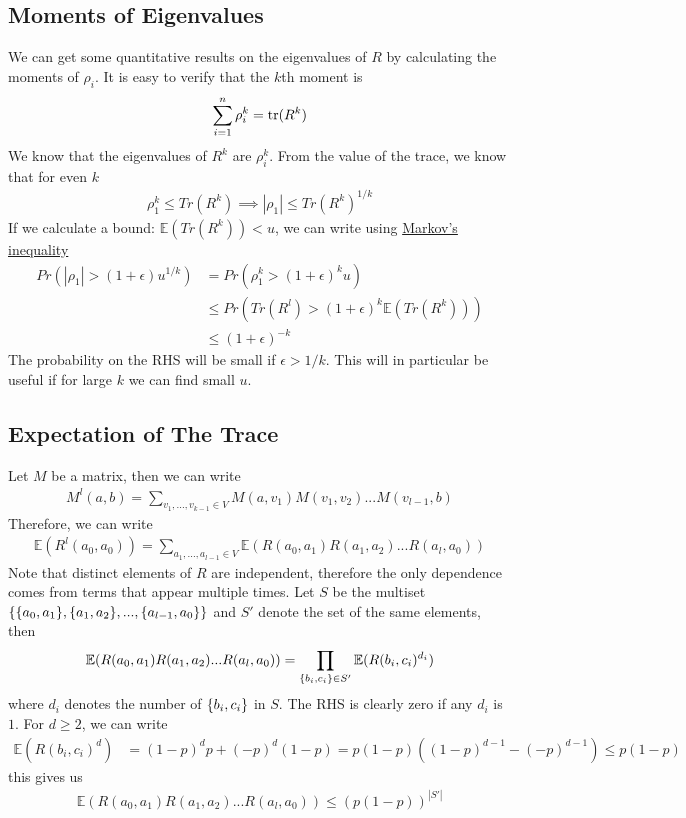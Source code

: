 \documentclass{math}
\newcommand{\expect}{\mathbb{E}}
\newcommand{\prob}{Pr}
\begin{document}
\subsection{Moments of Eigenvalues}

We can get some quantitative results on the eigenvalues of $R$ by calculating the moments of $\rho_i$.
It is easy to verify that the $k$th moment is
\begin{align*}
    \sum_{i=1}^{n} \rho_i^k = \trace(R^k)
\end{align*}
We know that the eigenvalues of $R^k$ are $\rho_i^k$.
From the value of the trace, we know that for even $k$
\begin{align*}
    \rho_1^k \leq Tr(R^k) \implies |\rho_1| \leq Tr(R^k)^{1/k}
\end{align*}
If we calculate a bound: $\expect(Tr(R^k)) < u$, we can write using \hyperref[thm:markov]{Markov's inequality}
\begin{align*}
    \prob(|\rho_1| > (1 + \epsilon)u^{1 / k}) & = \prob(\rho_1^k > (1 + \epsilon)^k u)                  \\
                                              & \leq \prob(Tr(R^l) > (1 + \epsilon)^k \expect(Tr(R^k))) \\
                                              & \leq (1 + \epsilon)^{-k}
\end{align*}
The probability on the RHS will be small if $\epsilon > 1 / k$.
This will in particular be useful if for large $k$ we can find small $u$.

\subsection{Expectation of The Trace}

Let $M$ be a matrix, then we can write
\begin{align*}
    M^l(a, b) = \sum_{v_1, ..., v_{k - 1} \in V} M(a, v_1) M(v_1, v_2) ... M(v_{l - 1}, b)
\end{align*}
Therefore, we can write
\begin{align*}
    \expect(R^l(a_0, a_0)) = \sum_{a_1, ..., a_{l-1} \in V} \expect(R(a_0, a_1) R(a_1, a_2) ... R(a_l, a_0))
\end{align*}
Note that distinct elements of $R$ are independent, therefore the only dependence comes from terms that appear multiple times.
Let $S$ be the multiset $\{ \{ a_0, a_1 \}, \{ a_1, a_2 \}, ..., \{ a_{l-1}, a_0 \} \}$ and $S'$ denote the set of the same elements, then
\begin{align*}
    \expect(R(a_0, a_1) R(a_1, a_2) ... R(a_l, a_0)) = \prod_{\set{b_i, c_i} \in S'} \expect(R(b_i, c_i)^{d_i})
\end{align*}
where $d_i$ denotes the number of $\{ b_i, c_i \}$ in $S$.
The RHS is clearly zero if any $d_i$ is $1$. For $d \geq 2$, we can write
\begin{align*}
    \expect(R(b_i, c_i)^d) & = (1 - p)^d p + (-p)^d (1 - p) = p(1 - p) \left((1-p)^{d - 1} - (-p)^{d-1}\right) \leq p(1 - p)
\end{align*}
this gives us
\begin{align*}
    \expect(R(a_0, a_1) R(a_1, a_2) ... R(a_l, a_0)) \leq (p(1-p))^{|S'|}
\end{align*}
\end{document}
